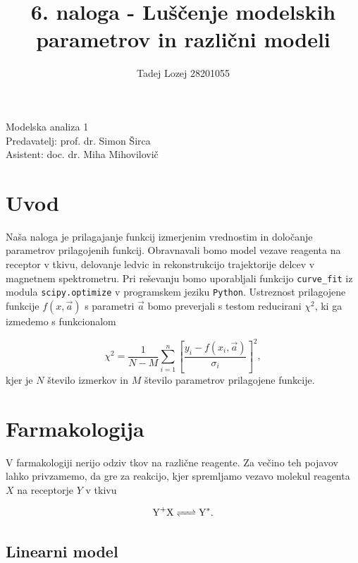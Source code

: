 \documentclass[slovene,11pt,a4paper]{article}
\begin{document}
\title{6. naloga - Luščenje modelskih parametrov in različni modeli}
\author{Tadej Lozej 28201055}
\maketitle
\begin{center}
Modelska analiza 1 \\
\bigskip
Predavatelj: prof. dr. Simon Širca \\
Asistent: doc. dr. Miha Mihovilovič
\end{center}

\newpage

\tableofcontents

\newpage

\section{Uvod}


Naša naloga je prilagajanje funkcij izmerjenim vrednostim in določanje parametrov prilagojenih funkcij. Obravnavali bomo model vezave reagenta na receptor v tkivu, delovanje ledvic in rekonstrukcijo trajektorije delcev v magnetnem spektrometru. Pri reševanju bomo uporabljali funkcijo \texttt{curve\_fit} iz modula \texttt{scipy.optimize} v programskem jeziku \texttt{Python}. Ustreznost prilagojene funkcije $f(x, \vec{a})$ s parametri $\vec{a}$ bomo preverjali s testom reducirani $\chi^2$, ki ga izmedemo s funkcionalom

\begin{equation}
\chi^2 = \frac{1}{N-M} \sum_{i=1}^n \left[
\frac{y_i - f(x_i, \vec{a})}{\sigma_i}
\right]^2,
\end{equation}
kjer je $N$ število izmerkov in $M$ število parametrov prilagojene funkcije.

\section{Farmakologija}

V farmakologiji nerijo odziv tkov na različne reagente. Za večino teh pojavov lahko privzamemo, da gre za reakcijo, kjer spremljamo vezavo molekul reagenta $X$ na receptorje $Y$ v tkivu

\begin{equation}
\ce{Y+X <=> Y^*}.
\end{equation}

\subsection{Linearni model}
\end{document}
